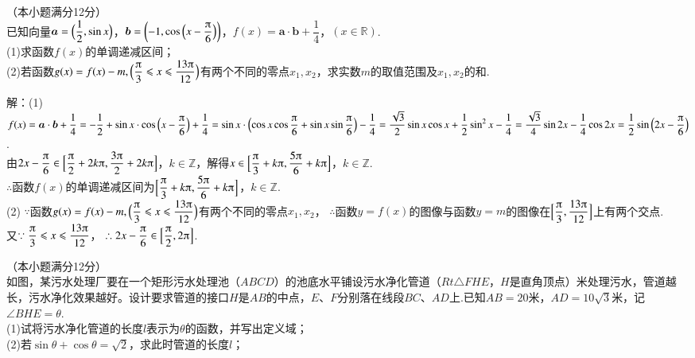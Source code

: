 \begin{exercise}
      （本小题满分12分）\\
      已知向量$\bm a=\Bigl(\dfrac{1}2,\sin x\Bigr)$，$\bm b=\biggl(-1,\cos{\Bigl(x-\dfrac{\piup}6\Bigr)}\biggr)$，$f(x)=\bm a\cdot\bm b+\dfrac{1}4$，$(x\in\mathbb{R})$.\\
      (1)求函数$f(x)$的单调递减区间；\\
      (2)若函数$g(x)=f(x)-m,\Bigl(\dfrac{\piup}3\leqslant x\leqslant\dfrac{13\piup}{12}\Bigr)$有两个不同的零点$x_1,x_2$，求实数$m$的取值范围及$x_1,x_2$的和.\\
      \begin{answer}
        解：(1)$f(x)=\bm a\cdot\bm b+\dfrac{1}4
        =-\dfrac12+\sin{x}\cdot\cos{\Bigl(x-\dfrac{\piup}6\Bigr)}+\dfrac14
        =\sin{x}\cdot \Bigl(\cos x\cos{\dfrac{\piup}6}+\sin x\sin{\dfrac{\piup}6}\Bigr)-\dfrac14
        =\dfrac{\sqrt3}2\sin x\cos x+\dfrac12\sin^2x-\dfrac14
        =\dfrac{\sqrt3}4\sin{2x}-\dfrac14\cos{2x}
        =\dfrac12\sin{\Bigl(2x-\dfrac{\piup}6\Bigr)}$.\\
        由$2x-\dfrac{\piup}6\in\Bigl[\dfrac{\piup}2+2k\piup,\dfrac{3\piup}2+2k\piup\Bigr]$，${k\in\mathbb{Z}}$，解得$x\in\Bigl[\dfrac{\piup}3+k\piup,\dfrac{5\piup}6+k\piup\Bigr]$，${k\in\mathbb{Z}}$.\\
        $\therefore$函数$f(x)$的单调递减区间为$\Bigl[\dfrac{\piup}3+k\piup,\dfrac{5\piup}6+k\piup\Bigr]$，${k\in\mathbb{Z}}$.\\
        (2) $\because$函数$g(x)=f(x)-m,\Bigl(\dfrac{\piup}3\leqslant x\leqslant\dfrac{13\piup}{12}\Bigr)$有两个不同的零点$x_1,x_2$，
        $\therefore$函数$y=f(x)$的图像与函数$y=m$的图像在$\Bigl[\dfrac{\piup}3,\dfrac{13\piup}{12}\Bigr]$上有两个交点.\\
        又$\because \dfrac{\piup}3\leqslant x\leqslant\dfrac{13\piup}{12}$，
        $\therefore 2x-\dfrac{\piup}6\in\Bigl[\dfrac{\piup}2,2\piup\Bigr]$.
      \end{answer}
    \item
      （本小题满分12分）\\
      如图，某污水处理厂要在一个矩形污水处理池（$ABCD$）的池底水平铺设污水净化管道（$Rt\triangle{FHE}$，$H$是直角顶点）米处理污水，管道越长，污水净化效果越好。设计要求管道的接口$H$是$AB$的中点，$E$、$F$分别落在线段$BC$、$AD$上.已知$AB=20$米，$AD=10\sqrt3$米，记$\angle{BHE}=\theta$.\\
      (1)试将污水净化管道的长度$l$表示为$\theta$的函数，并写出定义域；\\
      (2)若$\sin\theta+\cos\theta=\sqrt2$，求此时管道的长度$l$；\\

\end{exercise}
